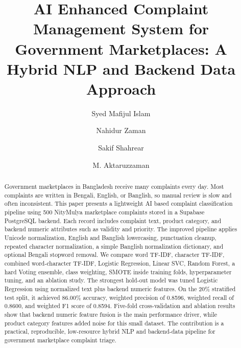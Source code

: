 \documentclass[a4paper,fleqn]{cas-dc}
\begin{document}
\let\WriteBookmarks\relax
\def\floatpagepagefraction{1}
\def\textpagefraction{.001}


\title[mode=title]{AI Enhanced Complaint Management System for Government Marketplaces: A Hybrid NLP and Backend Data Approach}

\author[1]{Syed Mafijul Islam}
\fnmark[1]

\author[1]{Nahidur Zaman}
\fnmark[1]

\author[1]{Sakif Shahrear}
\fnmark[1]

\author[1]{M. Aktaruzzaman}
\cormark[1]
\fnmark[2]

\address[1]{Military Institute of Science and Technology (MIST) and Daffodil International University, Dhaka, Bangladesh}


\begin{abstract}
Government marketplaces in Bangladesh receive many complaints every day. Most complaints are written in Bengali, English, or Banglish, so manual review is slow and often inconsistent. This paper presents a lightweight AI based complaint classification pipeline using 500 NityMulya marketplace complaints stored in a Supabase PostgreSQL backend. Each record includes complaint text, product category, and backend numeric attributes such as validity and priority. The improved pipeline applies Unicode normalization, English and Banglish lowercasing, punctuation cleanup, repeated character normalization, a simple Banglish normalization dictionary, and optional Bengali stopword removal. We compare word TF-IDF, character TF-IDF, combined word-character TF-IDF, Logistic Regression, Linear SVC, Random Forest, a hard Voting ensemble, class weighting, SMOTE inside training folds, hyperparameter tuning, and an ablation study. The strongest hold-out model was tuned Logistic Regression using normalized text plus backend numeric features. On the 20\% stratified test split, it achieved 86.00\% accuracy, weighted precision of 0.8596, weighted recall of 0.8600, and weighted F1 score of 0.8594. Five-fold cross-validation and ablation results show that backend numeric feature fusion is the main performance driver, while product category features added noise for this small dataset. The contribution is a practical, reproducible, low-resource hybrid NLP and backend-data pipeline for government marketplace complaint triage.
\end{abstract}
\end{document}
